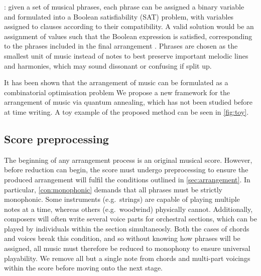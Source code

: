 \documentclass[12pt]{article}
\theoremstyle{definition}
\begin{document}
: given a set of musical phrases, each phrase can be assigned a binary variable and formulated into a Boolean satisfiability (SAT) problem, with variables assigned to clauses according to their compatibility. A valid solution would be an assignment of values such that the Boolean expression is satisfied, corresponding to the phrases included in the final arrangement . Phrases are chosen as the smallest unit of music instead of notes to best preserve important melodic lines and harmonies, which may sound dissonant or confusing if split up.

It has been shown that the arrangement of music can be formulated as a combinatorial optimisation problem \cite{moses_computational_2016}
We propose a new framework for the arrangement of music via quantum annealing, which has not been studied before at time writing. A toy example of the proposed method can be seen in \cref{fig:toy}.

\subsection{Score preprocessing}

The beginning of any arrangement process is an original musical score. However, before reduction can begin, the score must undergo preprocessing to ensure the produced arrangement will fulfil the conditions outlined in \cref{sec:arrangement}. In particular, \cref{con:monophonic} demands that all phrases must be strictly monophonic. Some instruments (e.g.\ strings) are capable of playing multiple notes at a time, whereas others (e.g.\ woodwind) physically cannot. Additionally, composers will often write several voice parts for orchestral sections, which can be played by individuals within the section simultaneosly. Both the cases of chords and voices break this condition, and so without knowing how phrases will be assigned, all music must therefore be reduced to monophony to ensure universal playability. We remove all but a single note from chords and multi-part voicings within the score before moving onto the next stage.

\end{document}
